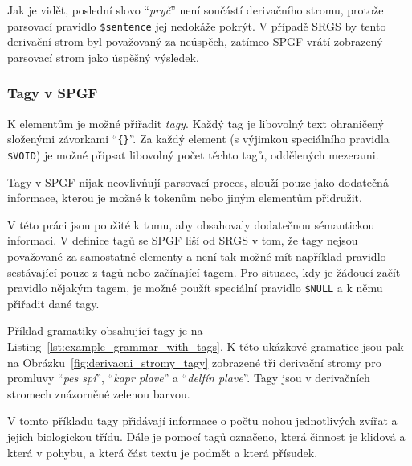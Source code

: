 Jak je vidět, poslední slovo \enquote{\emph{pryč}} není součástí derivačního stromu,
protože parsovací pravidlo \texttt{\$sentence} jej nedokáže pokrýt.
V případě SRGS by tento derivační strom byl považovaný za neúspěch, zatímco SPGF vrátí zobrazený parsovací strom
jako úspěšný výsledek.

\subsubsection{Tagy v SPGF}
K elementům je možné přiřadit \emph{tagy}.
Každý tag je libovolný text ohraničený složenými závorkami \enquote{\texttt{\{\}}}.
Za každý element (s výjimkou speciálního pravidla \texttt{\$VOID}) je možné připsat libovolný počet těchto tagů,
oddělených mezerami.

Tagy v SPGF nijak neovlivňují parsovací proces, slouží pouze jako dodatečná informace,
kterou je možné k tokenům nebo jiným elementům přidružit.

V této práci jsou použité k tomu, aby obsahovaly dodatečnou sémantickou informaci.
V definice tagů se SPGF liší od SRGS v tom, že tagy nejsou považované za samostatné elementy a není tak možné mít například
pravidlo sestávající pouze z tagů nebo začínající tagem.
Pro situace, kdy je žádoucí začít pravidlo nějakým tagem,
je možné použít speciální pravidlo \texttt{\$NULL} a k němu přiřadit dané tagy.

Příklad gramatiky obsahující tagy je na Listing~\ref{lst:example_grammar_with_tags}.
K této ukázkové gramatice jsou pak na Obrázku~\ref{fig:derivacni_stromy_tagy} zobrazené tři derivační stromy pro promluvy
\enquote{\emph{pes spí}},
\enquote{\emph{kapr plave}}
a
\enquote{\emph{delfín plave}}.
Tagy jsou v derivačních stromech znázorněné zelenou barvou.

V tomto příkladu tagy přidávají informace o počtu nohou jednotlivých zvířat a jejich biologickou třídu.
Dále je pomocí tagů označeno, která činnost je klidová a která v pohybu, a která část textu je podmět a která přísudek.

